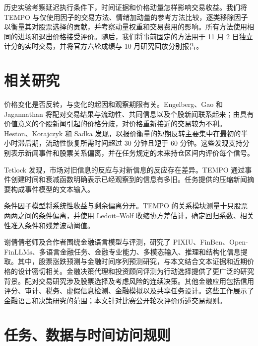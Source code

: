 \documentclass[conference]{IEEEtran}
\begin{document}
历史实验考察延迟执行条件下，时间证据和价格动量怎样影响交易收益。我们将 TEMPO 与仅使用因子的交易方法、情绪加动量的参考方法比较，逐类移除因子以衡量其对股票选择的贡献，并考察动量权重和交易费用的影响。所有方法使用相同的进场和退出价格接受评价。随后，我们将事前固定的方法用于 11 月 2 日独立计分的实时交易，并将官方六轮成绩与 10 月研究回放分别报告。

\section{相关研究}
价格变化是否反转，与变化的起因和观察期限有关。Engelberg、Gao 和 Jagannathan 将配对交易结果与流动性、共同信息以及个股新闻联系起来；由具有价值意义的个股新闻引起的价格分歧，对价格重新接近的交易较为不利\cite{engelberg2008}。Heston、Korajczyk 和 Sadka 发现，以报价衡量的短期反转主要集中在最初的半小时滞后期，流动性恢复所需时间超过 30 分钟且短于 60 分钟\cite{heston2010}。这些发现支持分别表示新闻事件和股票关系偏离，并在任务规定的未来持仓区间内评价每个信号。

Tetlock 发现，市场对旧信息的反应与对新信息的反应存在差异\cite{tetlock2011}。TEMPO 通过事件创建时间和衰减函数明确表示已经观察到的信息有多旧。任务提供的压缩新闻摘要构成事件模型的文本输入。

条件因子模型将系统性收益与剩余偏离分开\cite{spears2023}。TEMPO 的关系模块测量十只股票两两之间的条件偏离，并使用 Ledoit--Wolf 收缩协方差估计\cite{ledoit2004}，确定回归系数、相关性准入条件和残差波动阈值。

谢倩倩老师及合作者围绕金融语言模型与评测，研究了 PIXIU、FinBen、Open-FinLLMs、多语言金融任务、金融专业能力、多模态输入、推理和结构化信息提取\cite{xie2023pixiu,xie2024finben,xie2024openfinllms,hu2024nolang,peng2025multifinben,yang2025ucfe,lin2025leaderboard,qian2025fino1,cao2025finaudio,kuang2025scores,wang2025fintagging,zhang2024dolares,peng2025plutus}。其中，股票涨跌预测与金融时间序列预测研究，与本文结合文本证据和近期价格的设计密切相关\cite{xie2023wallstreet,xiao2025retrieval}。金融决策代理和投资顾问评测为行动选择提供了更广泛的研究背景\cite{yu2024fincon,li2025investorbench,xiong2025flagtrader,gong2026shijian,yang2026fincua}。配对交易研究涉及股票选择及考虑风险的连续决策\cite{han2023selecttrade,han2023riskpair}。其他金融应用包括信用评分、审计、税务、虚假信息检测、金融模拟以及共享任务设计\cite{feng2023credit,huang2024auditwen,huang2026auditjudg,hu2026taxpraben,liu2025fmdllama,liu2025misinformation,liu2026simulation,xie2024agentScen}。这些工作展示了金融语言和决策研究的范围；本文针对比赛公开轮次评价所述交易规则。

\section{任务、数据与时间访问规则}
\end{document}
